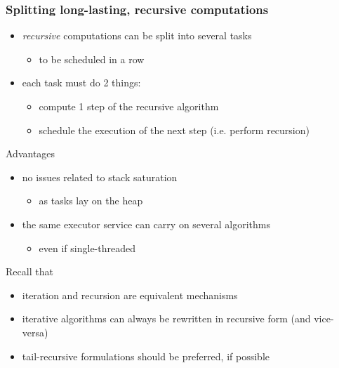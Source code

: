 \documentclass{beamer}\mode<presentation>{\usetheme{AMSBolognaFC}}
\begin{document}
\begin{frame}[allowframebreaks]
    \frametitle{Splitting long-lasting, \textbf{recursive} computations}

    \begin{itemize}
        \item \emph{recursive} computations can be \alert{split} into several tasks
        \begin{itemize}
            \item to be scheduled in a row
        \end{itemize}

        \bigskip

        \item each task must do 2 things:
        \begin{itemize}
            \item compute 1 step of the recursive algorithm
            \item schedule the execution of the next step (i.e. perform recursion)
        \end{itemize}

    \end{itemize}

    \bigskip

    \begin{block}{Advantages}
        \begin{itemize}
            \item no issues related to stack saturation
            \begin{itemize}
                \item as tasks lay on the heap
            \end{itemize}

            \item the same executor service can carry on several algorithms
            \begin{itemize}
                \item even if single-threaded
            \end{itemize}
        \end{itemize}
    \end{block}

    \bigskip

    \begin{exampleblock}{Recall that}
        \begin{itemize}
            \item iteration and recursion are equivalent mechanisms
            \item iterative algorithms can always be rewritten in recursive form (and vice-versa)
            \item tail-recursive formulations should be preferred, if possible
        \end{itemize}
    \end{exampleblock}


\end{frame}
\end{document}
